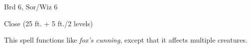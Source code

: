 
\begin{description*}
\item[Level:] Brd 6, Sor/Wiz 6
\item[Range:] Close (25 ft. + 5 ft./2 levels)
\end{description*}

This spell functions like \textit{fox's cunning}, except that it affects multiple
creatures.